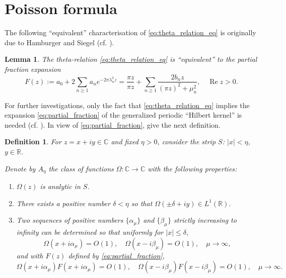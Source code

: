 \documentclass[11pt]{article}
\theoremstyle{plain}
\newtheorem{lemma}[theorem]{Lemma}
\newtheorem{definition}[theorem]{Definition}
\begin{document}
\section{Poisson formula}
\label{sec:poisson}

The following ``equivalent'' characterisation of \eqref{eq:theta_relation_eq} is originally due to Hamburger and Siegel (cf. \cite{4,11,19,29}).

\begin{lemma}
\label{lem:hilbert_kernel}
The theta-relation \eqref{eq:theta_relation_eq} is ``equivalent'' to the partial fraction expansion
\begin{equation}
F(z) := a_0 + 2\sum_{n \geq 1} a_n e^{-2\pi \lambda_n^2 z} = \frac{\pi z}{\pi z} + \sum_{n \geq 1} \frac{2b_n z}{(\pi z)^2 + \mu_n^2}, \quad \operatorname{Re} z > 0.
\label{eq:partial_fraction}
\end{equation}
\end{lemma}

For further investigations, only the fact that \eqref{eq:theta_relation_eq} implies the expansion \eqref{eq:partial_fraction} of the generalized periodic ``Hilbert kernel'' is needed (cf. \cite{6}). In view of \eqref{eq:partial_fraction}, give the next definition.

\begin{definition}
\label{def:class_An}
For $z = x + iy \in \mathbb{C}$ and fixed $\eta > 0$, consider the strip $S$: $|x| < \eta$, $y \in \mathbb{R}$.

Denote by $A_\eta$ the class of functions $\Omega: \mathbb{C} \to \mathbb{C}$ with the following properties:
\begin{enumerate}[label=(\roman*)]
\item $\Omega(z)$ is analytic in $S$.
\item There exists a positive number $\delta < \eta$ so that $\Omega(\pm \delta + iy) \in L^1(\mathbb{R})$.
\item Two sequences of positive numbers $\{\alpha_\mu\}$ and $\{\beta_\mu\}$ strictly increasing to infinity can be determined so that uniformly for $|x| \leq \delta$,
\begin{equation}
\Omega(x + i\alpha_\mu) = O(1), \quad \Omega(x - i\beta_\mu) = O(1), \quad \mu \to \infty,
\label{eq:hankel_class_1}
\end{equation}
and with $F(z)$ defined by \eqref{eq:partial_fraction},
\begin{equation}
\Omega(x + i\alpha_\mu) F(x + i\alpha_\mu) = O(1), \quad \Omega(x - i\beta_\mu) F(x - i\beta_\mu) = O(1), \quad \mu \to \infty.
\label{eq:hankel_class_2}
\end{equation}
\end{enumerate}
\end{definition}
\end{document}
